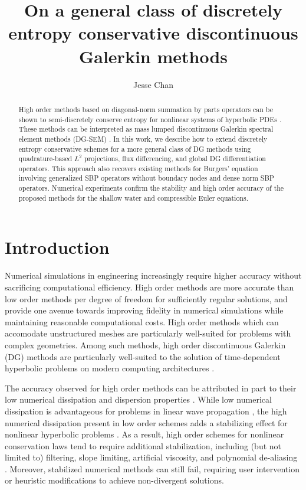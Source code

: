 \documentclass[preprint,10pt]{article}
\date{}
\author{Jesse Chan}
\title{On a general class of discretely entropy conservative discontinuous Galerkin methods}
\theoremstyle{definition}
\theoremstyle{lemma}
\theoremstyle{theorem}
\theoremstyle{assumption}
\begin{document}
\maketitle

\begin{abstract}
High order methods based on diagonal-norm summation by parts operators can be shown to semi-discretely conserve entropy for nonlinear systems of hyperbolic PDEs \cite{fisher2013high,carpenter2014entropy}.  These methods can be interpreted as mass lumped discontinuous Galerkin spectral element methods (DG-SEM) \cite{gassner2016split,gassner2016well,wintermeyer2017entropy, chen2017entropy}.  In this work, we describe how to extend discretely entropy conservative schemes for a more general class of DG methods using quadrature-based $L^2$ projections, flux differencing, and global DG differentiation operators.  This approach also recovers existing methods for Burgers' equation involving generalized SBP operators without boundary nodes and dense norm SBP operators.  Numerical experiments confirm the stability and high order accuracy of the proposed methods for the shallow water and compressible Euler equations.  
\end{abstract}

\tableofcontents

\section{Introduction}

Numerical simulations in engineering increasingly require higher accuracy without sacrificing computational efficiency.  High order methods are more accurate than low order methods per degree of freedom for sufficiently regular solutions, and provide one avenue towards improving fidelity in numerical simulations while maintaining reasonable computational costs.  High order methods which can accomodate unstructured meshes are particularly well-suited for problems with complex geometries.  Among such methods, high order discontinuous Galerkin (DG) methods are particularly well-suited to the solution of time-dependent hyperbolic problems on modern computing architectures \cite{hesthaven2007nodal, klockner2009nodal}.  

The accuracy observed for high order methods can be attributed in part to their low numerical dissipation and dispersion properties \cite{ainsworth2004dispersive}.  While low numerical dissipation is advantageous for problems in linear wave propagation \cite{komatitsch1998spectral}, the high numerical dissipation present in low order schemes adds a stabilizing effect for nonlinear hyperbolic problems \cite{wang2013high}.  As a result, high order schemes for nonlinear conservation laws tend to require additional stabilization, including (but not limited to) filtering, slope limiting, artificial viscosity, and polynomial de-aliasing \cite{persson2006sub, krivodonova2007limiters, karniadakis2013spectral, hesthaven2007nodal, kirby2003aliasing}.  Moreover, stabilized numerical methods can still fail, requiring user intervention or heuristic modifications to achieve non-divergent solutions.  
\end{document}
